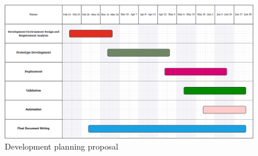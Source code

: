\documentclass[11pt,twoside,a4paper]{report}
\begin{document}
\begin{figure}[h]
\centering
\includegraphics[width=1\textwidth]{gantt.png}
\caption{Development planning proposal}
\label{fig:gantt}
\end{figure}

%
%
\cleardoublepage
\iffalse
\else






\cleardoublepage
\end{document}
